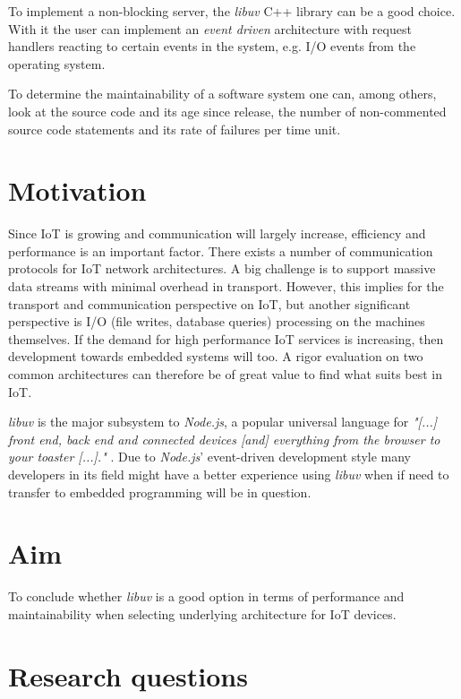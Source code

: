 To implement a non-blocking server, the \textit{libuv} C++ library can be a
good choice. With it the user can implement an \textit{event driven}
architecture with request handlers reacting to certain events in the system,
e.g. I/O events from the operating system. \cite{libuv-webpage}

To determine the maintainability of a software system one can, among others,
look at the source code and its age since release, the number of non-commented
source code statements and its rate of failures per time unit.
\cite{oman1992metrics}

\section{Motivation}
\label{sec:motivation}

Since IoT is growing and communication will largely increase, efficiency and
performance is an important factor. There exists a number of communication
protocols for IoT network architectures. A big challenge is to support massive
data streams with minimal overhead in transport. However, this implies for the
transport and communication perspective on IoT, but another significant
perspective is I/O (file writes, database queries) processing on the machines
themselves. If the demand for high performance IoT services is increasing, then
development towards embedded systems will too. A rigor evaluation on two common
architectures can therefore be of great value to find what suits best in IoT.

\textit{libuv} is the major subsystem to \textit{Node.js}, a popular universal
language for \textit{"[...] front end, back end and connected devices [and]
everything from the browser to your toaster [...]."}
\cite{node-js-survey-report-2016}. Due to \textit{Node.js}' event-driven
development style many developers in its field might have a better experience
using \textit{libuv} when if need to transfer to embedded programming will be
in question.

\section{Aim}
\label{sec:aim}

To conclude whether \textit{libuv} is a good option in terms of performance and
maintainability when selecting underlying architecture for IoT devices.

\section{Research questions}
\label{sec:research-questions}

